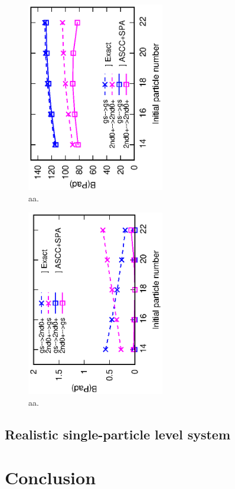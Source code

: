 \documentclass[%
superscriptaddress,
showpacs,
nofootinbib,
amsmath,amssymb,
aps,
prc,
twocolumn,
floatfix ]%
{revtex4-1}
\begin{document}
\begin{figure}[t]
 \begin{center}
  \includegraphics[width=60mm,angle=-90]{intra_trans.eps}
 \end{center}
 \captionsetup{labelformat=empty,labelsep=none}
	\caption{aa.
}
 \label{3levelPad}
\end{figure}

\begin{figure}[t]
 \begin{center}
  \includegraphics[width=60mm,angle=-90]{inter_trans.eps}
 \end{center}
 \captionsetup{labelformat=empty,labelsep=none}
	\caption{aa.
}
 \label{3levelPad}
\end{figure}

\subsection{Realistic single-particle level system}





\section{Conclusion}
\end{document}
